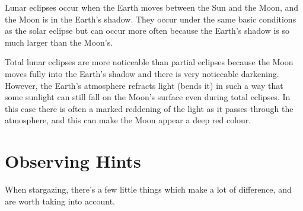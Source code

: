 Lunar eclipses occur when the Earth moves between the Sun and the Moon,
and the Moon is in the Earth's shadow. They occur under the same basic
conditions as the solar eclipse but can occur more often because the
Earth's shadow is so much larger than the Moon's.

Total lunar eclipses are more noticeable than partial eclipses because
the Moon moves fully into the Earth's shadow and there is very
noticeable darkening. However, the Earth's atmosphere refracts light
(bends it) in such a way that some sunlight can still fall on the Moon's
surface even during total eclipses. In this case there is often a marked
reddening of the light as it passes through the atmosphere, and this can
make the Moon appear a deep red colour.






\section{Observing Hints}\label{observing-hints}

When stargazing, there's a few little things which make a lot of
difference, and are worth taking into account.

